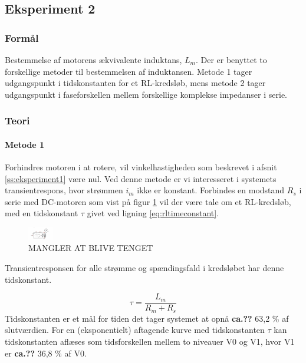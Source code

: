 \subsection{Eksperiment 2}
\label{ss:eksperiment2}
\subsubsection{Formål}
Bestemmelse af motorens ækvivalente induktans, \(L_m\).
Der er benyttet to forskellige metoder til bestemmelsen af induktansen.
Metode 1 tager udgangspunkt i tidskonstanten for et RL-kredsløb,
mens metode 2 tager udgangspunkt i faseforskellen mellem forskellige komplekse impedanser i serie.
\subsubsection{Teori}
\paragraph{Metode 1}
Forhindres motoren i at rotere, vil vinkelhastigheden som beskrevet i afsnit \ref{ss:eksperiment1} være nul.
Ved denne metode er vi interesseret i systemets transientrespons, hvor strømmen \(i_m\) ikke er konstant.
Forbindes en modstand \(R_s\) i serie med DC-motoren som vist på figur \ref{fig:eksperiment2metode1} vil der være tale om et RL-kredsløb, med en tidskonstant \(\tau\) givet ved ligning \ref{eq:rltimeconstant}.

\begin{figure}[!th]
\centering
\includegraphics[width=0.1\textwidth]{./graphics/Mangleratblivetegnet2}
%
\caption[]{MANGLER AT BLIVE TENGET}
\label{fig:eksperiment2metode1}
\end{figure}


Transientresponsen for alle strømme og spændingsfald i kredsløbet har denne tidskonstant.

\begin{equation}
	\tau=\frac{L_m}{R_m+R_s}
	\label{eq:rltimeconstant} 
 \end{equation}
Tidskonstanten er et mål for tiden det tager systemet at opnå \textbf{ca.??} 63,2 \% af slutværdien. For en (eksponentielt) aftagende kurve med tidskonstanten \(\tau\) kan tidskonstanten aflæses som
tidsforskellen mellem to niveauer V0 og V1, hvor V1 er \textbf{ca.??} 36,8 \% af V0.

